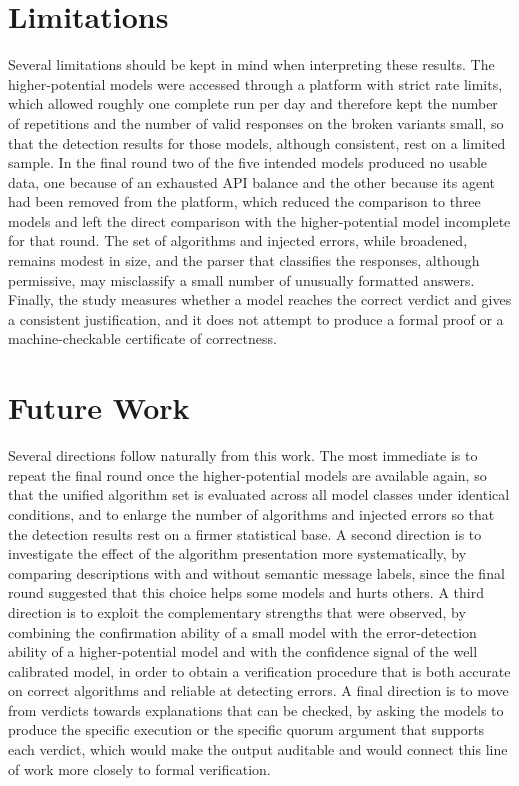 \section{Limitations}

Several limitations should be kept in mind when interpreting these results. The higher-potential models were accessed through a platform with strict rate limits, which allowed roughly one complete run per day and therefore kept the number of repetitions and the number of valid responses on the broken variants small, so that the detection results for those models, although consistent, rest on a limited sample. In the final round two of the five intended models produced no usable data, one because of an exhausted API balance and the other because its agent had been removed from the platform, which reduced the comparison to three models and left the direct comparison with the higher-potential model incomplete for that round. The set of algorithms and injected errors, while broadened, remains modest in size, and the parser that classifies the responses, although permissive, may misclassify a small number of unusually formatted answers. Finally, the study measures whether a model reaches the correct verdict and gives a consistent justification, and it does not attempt to produce a formal proof or a machine-checkable certificate of correctness.

\section{Future Work}

Several directions follow naturally from this work. The most immediate is to repeat the final round once the higher-potential models are available again, so that the unified algorithm set is evaluated across all model classes under identical conditions, and to enlarge the number of algorithms and injected errors so that the detection results rest on a firmer statistical base. A second direction is to investigate the effect of the algorithm presentation more systematically, by comparing descriptions with and without semantic message labels, since the final round suggested that this choice helps some models and hurts others. A third direction is to exploit the complementary strengths that were observed, by combining the confirmation ability of a small model with the error-detection ability of a higher-potential model and with the confidence signal of the well calibrated model, in order to obtain a verification procedure that is both accurate on correct algorithms and reliable at detecting errors. A final direction is to move from verdicts towards explanations that can be checked, by asking the models to produce the specific execution or the specific quorum argument that supports each verdict, which would make the output auditable and would connect this line of work more closely to formal verification.

